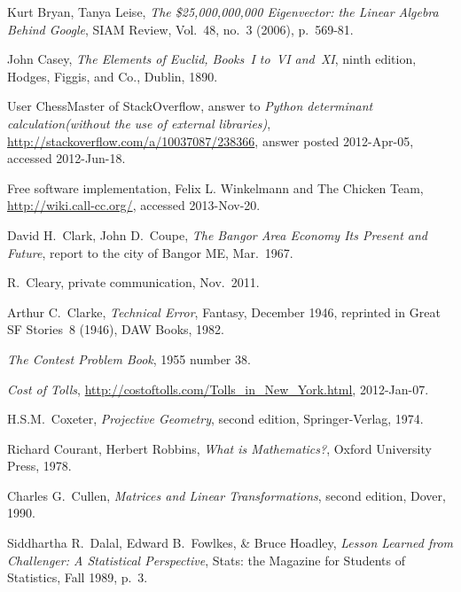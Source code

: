 \begin{thebibliography}{\makebox[2em][c]{{}\hfil{}}}
  Kurt Bryan, Tanya Leise,
  \emph{The \$25,000,000,000 Eigenvector: the Linear Algebra Behind Google},
  SIAM Review, 
  Vol.\ 48, no.\ 3 (2006), p.\ 569-81. 

  John Casey,
  \emph{The Elements of Euclid, Books~I to~VI and~XI},
  ninth edition,
  Hodges, Figgis, and Co.,
  Dublin,
  1890.

  User ChessMaster of StackOverflow,
  answer to   
  \textit{Python determinant calculation(without the use of external libraries)},
  \url{http://stackoverflow.com/a/10037087/238366},
  answer posted 2012-Apr-05,
  accessed 2012-Jun-18.

  Free software implementation,
  Felix L. Winkelmann and The Chicken Team,
  \url{http://wiki.call-cc.org/},
  accessed 2013-Nov-20.

  David H.\ Clark, John D.\ Coupe,
  \emph{The Bangor Area Economy Its Present and Future},
  report to the city of Bangor ME,
  Mar.\ 1967.

  R.~Cleary,
  private communication,
  Nov.\ 2011.

  Arthur C.~Clarke,
  \emph{Technical Error},
  Fantasy, December 1946,
  reprinted in
  Great SF Stories~8 (1946),
  DAW Books, 1982. 

  \emph{The Contest Problem Book},
  1955 number 38.

  \emph{Cost of Tolls},
  \url{http://costoftolls.com/Tolls_in_New_York.html},
  2012-Jan-07.

  H.S.M.~Coxeter,
  \emph{Projective Geometry},
  second edition,
  Springer-Verlag, 1974.

  Richard Courant, Herbert Robbins,
  \emph{What is Mathematics?},
  Oxford University Press, 1978.

  Charles G.\ Cullen,
  \emph{Matrices and Linear Transformations},
  second edition,
  Dover,
  1990.

  Siddhartha R.~Dalal, Edward B.~Fowlkes, \& Bruce Hoadley,
  \emph{Lesson Learned from Challenger: A Statistical Perspective},
  Stats: the Magazine for Students of Statistics,
  Fall 1989,
  p.~3.


\end{thebibliography}
